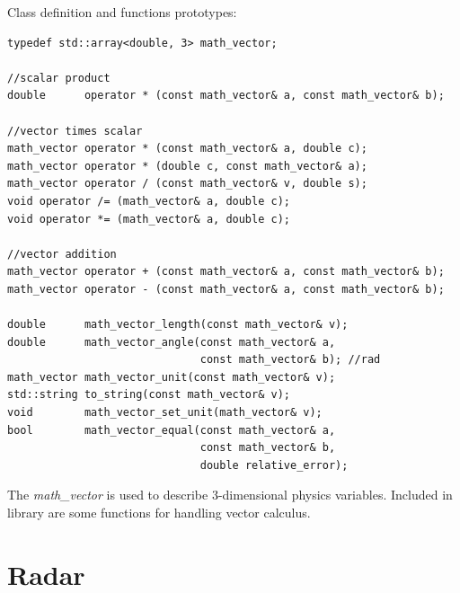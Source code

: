 \documentclass[letterpaper]{book}
\begin{document}
Class definition and functions prototypes:
\begin{lstlisting}
typedef std::array<double, 3> math_vector;

//scalar product
double      operator * (const math_vector& a, const math_vector& b);

//vector times scalar
math_vector operator * (const math_vector& a, double c);
math_vector operator * (double c, const math_vector& a);
math_vector operator / (const math_vector& v, double s);
void operator /= (math_vector& a, double c);
void operator *= (math_vector& a, double c);

//vector addition
math_vector operator + (const math_vector& a, const math_vector& b);
math_vector operator - (const math_vector& a, const math_vector& b);

double      math_vector_length(const math_vector& v);
double      math_vector_angle(const math_vector& a, 
                              const math_vector& b); //rad
math_vector math_vector_unit(const math_vector& v);
std::string to_string(const math_vector& v);
void        math_vector_set_unit(math_vector& v);
bool        math_vector_equal(const math_vector& a, 
                              const math_vector& b, 
                              double relative_error); 
\end{lstlisting}
The \textit{math\_vector} is used to describe 3-dimensional physics variables. Included in library are some functions for handling vector calculus. 


\section{Radar}
\end{document}
